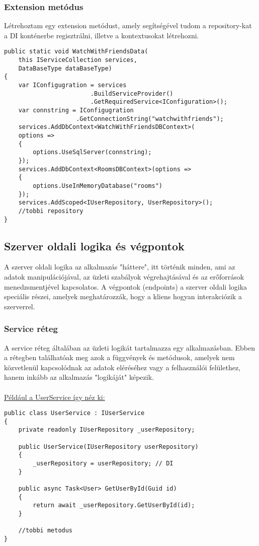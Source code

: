 \subsubsection*{Extension metódus}
Létrehoztam egy extension metódust, amely segítségével tudom a repository-kat a DI konténerbe regisztrálni, illetve a kontextusokat létrehozni.
\begin{lstlisting}[language=CSharp,style=CSharpBase]
public static void WatchWithFriendsData(
    this IServiceCollection services,
    DataBaseType dataBaseType)
{
    var IConfigugration = services
                        .BuildServiceProvider()
                        .GetRequiredService<IConfiguration>();
    var connstring = IConfigugration
                    .GetConnectionString("watchwithfriends");
    services.AddDbContext<WatchWithFriendsDBContext>(
    options =>
    {
        options.UseSqlServer(connstring);
    });
    services.AddDbContext<RoomsDBContext>(options =>
    {
        options.UseInMemoryDatabase("rooms")
    });
    services.AddScoped<IUserRepository, UserRepository>();
    //tobbi repository
}

\end{lstlisting}
\vspace{1em}
\subsection*{Szerver oldali logika és végpontok}
A szerver oldali logika az alkalmazás "háttere", itt történik minden, ami az adatok manipulációjával, az üzleti szabályok végrehajtásával és az erőforrások menedzsmentjével kapcsolatos. A végpontok (endpoints) a szerver oldali logika speciális részei, amelyek meghatározzák, hogy a kliens hogyan interakciózik a szerverrel.
\subsubsection*{Service réteg}
A service réteg általában az üzleti logikát tartalmazza egy alkalmazásban. Ebben a rétegben találhatóak meg azok a függvények és metódusok, amelyek nem közvetlenül kapcsolódnak az adatok eléréséhez vagy a felhasználói felülethez, hanem inkább az alkalmazás "logikáját" képezik.
\\
\\
\underline{Például a UserService így néz ki:}
\begin{lstlisting}[language=CSharp,style=CSharpBase,caption={User Service}]
public class UserService : IUserService
{
    private readonly IUserRepository _userRepository;

    public UserService(IUserRepository userRepository)
    {
        _userRepository = userRepository; // DI
    }

    public async Task<User> GetUserById(Guid id)
    {
        return await _userRepository.GetUserById(id);
    }

    //tobbi metodus
}
\end{lstlisting}
\vspace{1em}
